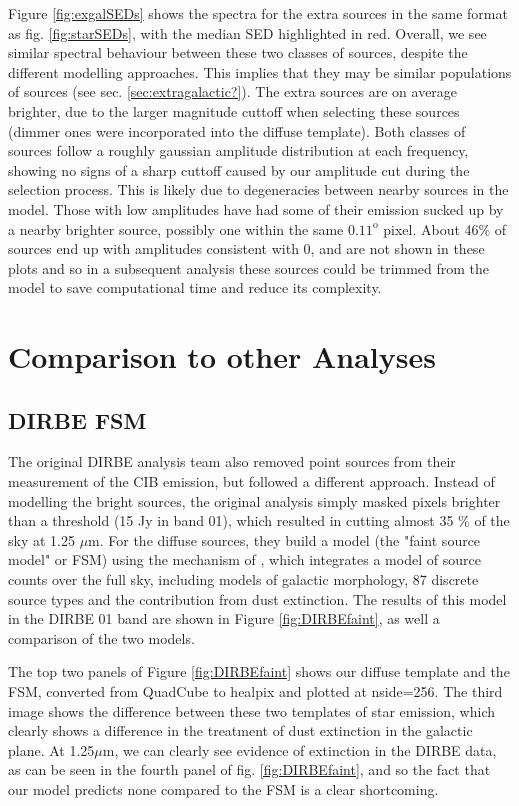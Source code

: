 \documentclass{aa}
\begin{document}
Figure \ref{fig:exgalSEDs} shows the spectra for the extra sources in the same format as fig. \ref{fig:starSEDs}, with the median SED highlighted in red. Overall, we see similar spectral behaviour between these two classes of sources, despite the different modelling approaches. This implies that they may be similar populations of sources (see sec. \ref{sec:extragalactic?}). The extra sources are on average brighter, due to the larger magnitude cuttoff when selecting these sources (dimmer ones were incorporated into the diffuse template). Both classes of sources follow a roughly gaussian amplitude distribution at each frequency, showing no signs of a sharp cuttoff caused by our amplitude cut during the selection process. This is likely due to degeneracies between nearby sources in the model. Those with low amplitudes have had some of their emission sucked up by a nearby brighter source, possibly one within the same $0.11^{\mathrm{o}}$ pixel. About 46\% of sources end up with amplitudes consistent with 0, and are not shown in these plots and so in a subsequent analysis these sources could be trimmed from the model to save computational time and reduce its complexity.


\section{Comparison to other Analyses}
\label{sec:consistency}

\subsection{DIRBE FSM}

The original DIRBE analysis team \citep{dirbeFaint} also removed point sources from their measurement of the CIB emission, but followed a different approach. Instead of modelling the bright sources, the original analysis simply masked pixels brighter than a threshold (15 Jy in band 01), which resulted in cutting almost 35 \% of the sky at 1.25 $\mu$m. For the diffuse sources, they build a model (the "faint source model" or FSM) using the mechanism of \cite{wainscoat}, which integrates a model of source counts over the full sky, including models of galactic morphology, 87 discrete source types and the contribution from dust extinction. The results of this model in the DIRBE 01 band are shown in Figure \ref{fig:DIRBEfaint}, as well a comparison of the two models. 

The top two panels of Figure \ref{fig:DIRBEfaint} shows our diffuse template and the FSM, converted from QuadCube to healpix and plotted at nside=256. The third image shows the difference between these two templates of star emission, which clearly shows a difference in the treatment of dust extinction in the galactic plane. At 1.25$\mu$m, we can clearly see evidence of extinction in the DIRBE data, as can be seen in the fourth panel of fig. \ref{fig:DIRBEfaint}, and so the fact that our model predicts none compared to the FSM is a clear shortcoming. 
\end{document}
